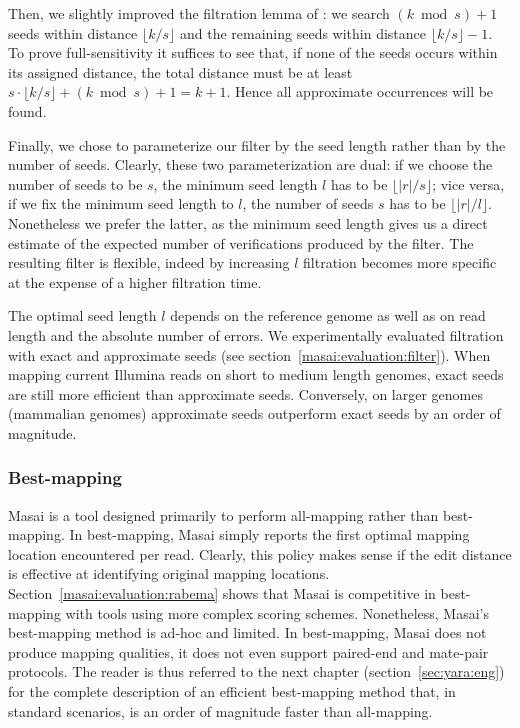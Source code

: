 Then, we slightly improved the filtration lemma of \citep{Navarro2000}:
we search $(k \bmod{s}) + 1$ seeds within distance $\lfloor k/s \rfloor$ and the remaining seeds within distance $\lfloor k/s \rfloor - 1$.
To prove full-sensitivity it suffices to see that, if none of the seeds occurs within its assigned distance, the total distance must be at least $s \cdot \lfloor k/s \rfloor + (k \bmod s) + 1 = k + 1$.
Hence all approximate occurrences will be found.

Finally, we chose to parameterize our filter by the seed length rather than by the number of seeds.
Clearly, these two parameterization are dual: if we choose the number of seeds to be $s$, the minimum seed length $l$ has to be $\lfloor |r|/s \rfloor$; vice versa, if we fix the minimum seed length to $l$, the number of seeds $s$ has to be $\lfloor |r|/l \rfloor$.
Nonetheless we prefer the latter, as the minimum seed length gives us a direct estimate of the expected number of verifications produced by the filter.
The resulting filter is flexible, indeed by increasing $l$ filtration becomes more specific at the expense of a higher filtration time.

The optimal seed length $l$ depends on the reference genome as well as on read length and the absolute number of errors.
We experimentally evaluated filtration with exact and approximate seeds (see section~\ref{masai:evaluation:filter}).
When mapping current Illumina reads on short to medium length genomes, exact seeds are still more efficient than approximate seeds.
Conversely, on larger genomes (\eg mammalian genomes) approximate seeds outperform exact seeds by an order of magnitude.

\subsubsection{Best-mapping}

Masai is a tool designed primarily to perform all-mapping rather than best-mapping.
In best-mapping, Masai simply reports the first optimal mapping location encountered per read.
Clearly, this policy makes sense if the edit distance is effective at identifying original mapping locations.
Section~\ref{masai:evaluation:rabema} shows that Masai is competitive in best-mapping with tools using more complex scoring schemes.
Nonetheless, Masai's best-mapping method is ad-hoc and limited.
In best-mapping, Masai does not produce mapping qualities, it does not even support paired-end and mate-pair protocols.
The reader is thus referred to the next chapter (section~\ref{sec:yara:eng}) for the complete description of an efficient best-mapping method that, in standard scenarios, is an order of magnitude faster than all-mapping.

